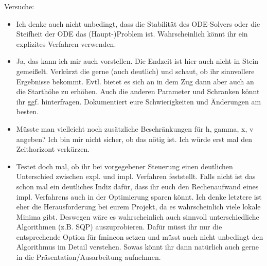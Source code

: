 Versuche:
\begin{itemize}
\item Ich denke auch nicht unbedingt, dass die Stabilität des ODE-Solvers oder
die Steifheit der ODE das (Haupt-)Problem ist.
Wahrscheinlich könnt ihr ein explizites Verfahren verwenden.
%
\item Ja, das kann ich mir auch vorstellen. Die Endzeit ist hier auch nicht in
Stein gemeißelt. Verkürzt die gerne (auch deutlich) und schaut, ob ihr
sinnvollere Ergebnisse bekommt. Evtl. bietet es sich an in dem Zug dann
aber auch an die Starthöhe zu erhöhen. 
Auch die anderen Parameter und Schranken könnt ihr ggf. hinterfragen.
Dokumentiert eure Schwierigkeiten und Änderungen am besten.
%
\item Müsste man vielleicht noch zusätzliche Beschränkungen für h, gamma, x, v angeben? Ich bin mir nicht sicher, ob das nötig ist. Ich würde erst mal den
Zeithorizont verkürzen.
%
\item Testet doch mal, ob ihr bei vorgegebener Steuerung
einen deutlichen Unterschied zwischen expl. und impl. Verfahren
feststellt. Falls nicht ist das schon mal ein deutliches Indiz dafür,
dass ihr euch den Rechenaufwand eines impl. Verfahrens auch in der
Optimierung sparen könnt. Ich denke letztere ist eher die Herausforderung bei eurem Projekt, da es wahrscheinlich viele lokale Minima gibt. Deswegen wäre es wahrscheinlich auch sinnvoll unterschiedliche Algorithmen (z.B. SQP) auszuprobieren. Dafür müsst ihr nur die entsprechende Option für fmincon setzen und müsst auch nicht unbedingt den Algorithmus im Detail verstehen. Sowas könnt ihr dann natürlich auch gerne in die Präsentation/Ausarbeitung aufnehmen.
\end{itemize}






























